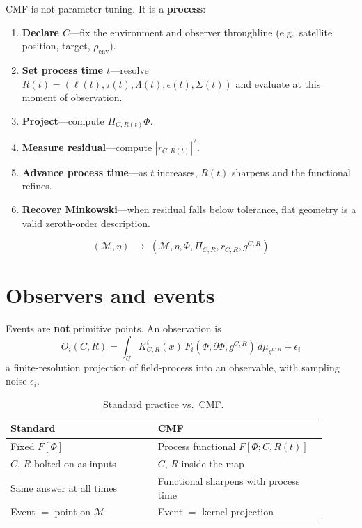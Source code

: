 \documentclass[11pt,a4paper]{article}
\newcommand{\M}{\mathcal{M}}
\newcommand{\Ph}{\Phi}
\begin{document}
CMF is not parameter tuning. It is a \textbf{process}:
\begin{enumerate}
  \item \textbf{Declare $C$}---fix the environment and observer throughline (e.g.\ satellite position, target, $\rho_{\mathrm{env}}$).
  \item \textbf{Set process time $t$}---resolve $R(t)=(\ell(t),\tau(t),\Lambda(t),\epsilon(t),\Sigma(t))$ and evaluate at this moment of observation.
  \item \textbf{Project}---compute $\Pi_{C,R(t)}\Ph$.
  \item \textbf{Measure residual}---compute $|r_{C,R(t)}|^2$.
  \item \textbf{Advance process time}---as $t$ increases, $R(t)$ sharpens and the functional refines.
  \item \textbf{Recover Minkowski}---when residual falls below tolerance, flat geometry is a valid zeroth-order description.
\end{enumerate}

\begin{equation}
  \boxed{
  (\M,\eta) \;\longrightarrow\; (\M,\eta,\Ph,\Pi_{C,R},r_{C,R},g^{C,R})
  }
\end{equation}

\section{Observers and events}

Events are \textbf{not} primitive points. An observation is
\begin{equation}
  O_i(C,R) = \int_U K^i_{C,R}(x)\, F_i(\Ph,\partial\Ph,g^{C,R})\, d\mu_{g^{C,R}} + \epsilon_i
  \label{eq:observer}
\end{equation}
a finite-resolution projection of field-process into an observable, with sampling noise $\epsilon_i$.

\begin{table}[h]
  \centering
  \caption{Standard practice vs.\ CMF.}
  \label{tab:contrast}
  \begin{tabular}{@{}p{0.42\linewidth}p{0.48\linewidth}@{}}
    \toprule
    Standard & CMF \\
    \midrule
    Fixed $F[\Ph]$ & Process functional $F[\Ph; C, R(t)]$ \\
    $C$, $R$ bolted on as inputs & $C$, $R$ inside the map \\
    Same answer at all times & Functional sharpens with process time \\
    Event $=$ point on $\M$ & Event $=$ kernel projection \\
    \bottomrule
  \end{tabular}
\end{table}
\end{document}
